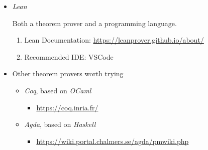 \documentclass{article}
\begin{document}
\begin{itemize}
\item \emph{Lean}

Both a theorem prover and a programming language.

\begin{enumerate}
    \item Lean Documentation:
    \href{https://leanprover.github.io/about/}{https://leanprover.github.io/about/}
    \item Recommended IDE: VSCode
\end{enumerate}

\item Other theorem provers worth trying
\begin{itemize}
    \item \emph{Coq}, based on \emph{OCaml}
    \begin{itemize}
        \item \href{https://coq.inria.fr/}{https://coq.inria.fr/}
    \end{itemize}
    \item \emph{Agda}, based on \emph{Haskell}
    \begin{itemize}
        \item \href{https://wiki.portal.chalmers.se/agda/pmwiki.php}{https://wiki.portal.chalmers.se/agda/pmwiki.php}
    \end{itemize}
\end{itemize}

\end{itemize}
\end{document}
